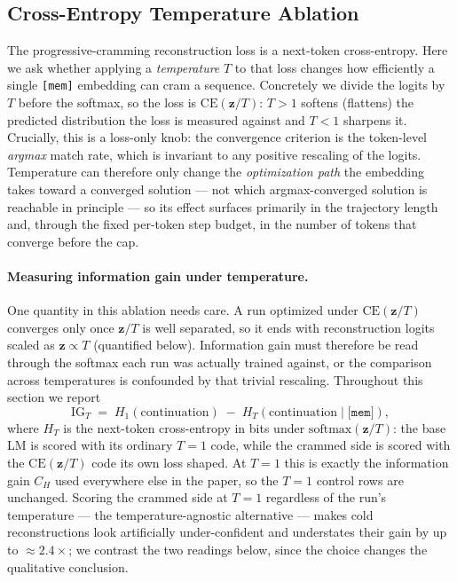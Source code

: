 \subsection{Cross-Entropy Temperature Ablation}
\label{app:ce_temperature}

The progressive-cramming reconstruction loss is a next-token cross-entropy. Here we ask whether applying a \emph{temperature} $T$ to that loss changes how efficiently a single \texttt{[mem]} embedding can cram a sequence. Concretely we divide the logits by $T$ before the softmax, so the loss is $\mathrm{CE}(\mathbf{z}/T)$: $T>1$ softens (flattens) the predicted distribution the loss is measured against and $T<1$ sharpens it. Crucially, this is a loss-only knob: the convergence criterion is the token-level \emph{argmax} match rate, which is invariant to any positive rescaling of the logits. Temperature can therefore only change the \emph{optimization path} the embedding takes toward a converged solution --- not which argmax-converged solution is reachable in principle --- so its effect surfaces primarily in the trajectory length and, through the fixed per-token step budget, in the number of tokens that converge before the cap.

\paragraph{Measuring information gain under temperature.} One quantity in this ablation needs care. A run optimized under $\mathrm{CE}(\mathbf{z}/T)$ converges only once $\mathbf{z}/T$ is well separated, so it ends with reconstruction logits scaled as $\mathbf{z}\propto T$ (quantified below). Information gain must therefore be read through the softmax each run was actually trained against, or the comparison across temperatures is confounded by that trivial rescaling. Throughout this section we report
\begin{equation}
    \mathrm{IG}_T \;=\; H_{1}(\text{continuation}) \;-\; H_{T}(\text{continuation}\mid\texttt{[mem]}),
\end{equation}
where $H_{T}$ is the next-token cross-entropy in bits under $\mathrm{softmax}(\mathbf{z}/T)$: the base LM is scored with its ordinary $T{=}1$ code, while the crammed side is scored with the $\mathrm{CE}(\mathbf{z}/T)$ code its own loss shaped. At $T{=}1$ this is exactly the information gain $C_H$ used everywhere else in the paper, so the $T{=}1$ control rows are unchanged. Scoring the crammed side at $T{=}1$ regardless of the run's temperature --- the temperature-agnostic alternative --- makes cold reconstructions look artificially under-confident and understates their gain by up to ${\approx}2.4\times$; we contrast the two readings below, since the choice changes the qualitative conclusion.

